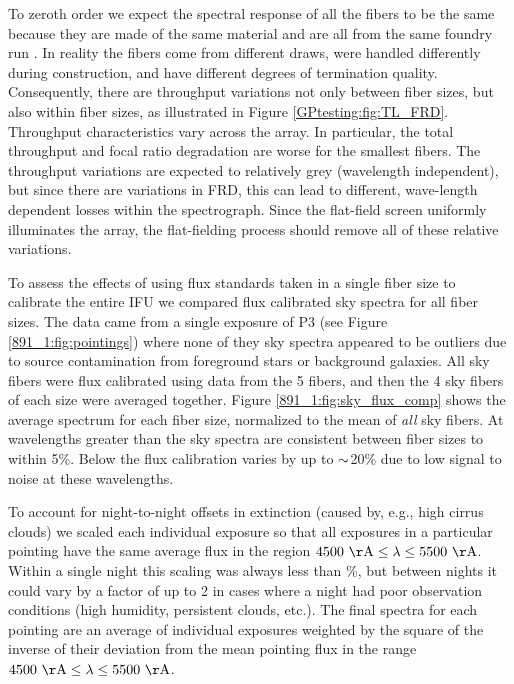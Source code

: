 To zeroth order we expect the spectral response of all the \GP fibers
to be the same because they are made of the same material and are all
from the same foundry run \citep{Wood12}. In reality the \GP fibers
come from different draws, were handled differently during
construction, and have different degrees of termination quality.
Consequently, there are throughput variations not only between fiber
sizes, but also within fiber sizes, as illustrated in Figure
\ref{GPtesting:fig:TL_FRD}.  Throughput characteristics vary across the \GP
array. In particular, the total throughput and focal ratio degradation
are worse for the smallest fibers. The throughput variations are
expected to relatively grey (wavelength independent), but since there
are variations in FRD, this can lead to different, wave-length
dependent losses within the spectrograph. Since the flat-field screen
uniformly illuminates the array, the flat-fielding process should
remove all of these relative variations.

To assess the effects of using flux standards taken in a single fiber
size to calibrate the entire \GP IFU we compared flux calibrated sky
spectra for all fiber sizes. The data came from a single exposure of
P3 (see Figure \ref{891_1:fig:pointings}) where none of they sky spectra
appeared to be outliers due to source contamination from foreground
stars or background galaxies.  All sky fibers were flux calibrated
using data from the 5 fibers, and then the 4 sky fibers of each
size were averaged together. Figure \ref{891_1:fig:sky_flux_comp} shows the
average spectrum for each fiber size, normalized to the mean of
\emph{all} sky fibers. At wavelengths greater than  the
sky spectra are consistent between fiber sizes to within 5\%. Below
 the flux calibration varies by up to ${\sim}$20\% due
to low signal to noise at these wavelengths.


To account for night-to-night offsets in extinction (caused by, e.g.,
high cirrus clouds) we scaled each individual exposure so that all
exposures in a particular pointing have the same average flux in the
region $\val{4500}{\AA} \leq \lambda \leq \val{5500}{\AA}$. Within a
single night this scaling was always less than \%, but between
nights it could vary by a factor of up to 2 in cases where a night had
poor observation conditions (high humidity, persistent clouds,
etc.). The final spectra for each pointing are an average of
individual exposures weighted by the square of the inverse of their
deviation from the mean pointing flux in the range $\val{4500}{\AA}
\leq \lambda \leq \val{5500}{\AA}$.

